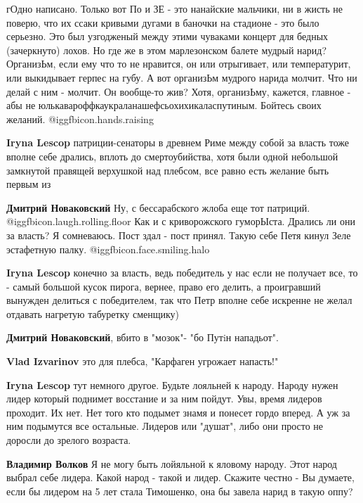 \begin{itemize}
гОдно написано. Только вот По и ЗЕ - это нанайские мальчики, ни в жисть не
поверю, что их ссаки кривыми дугами в баночки на стадионе - это было серьезно.
Это был узгодженый между этими чуваками концерт для бедных (зачеркнуто) лохов.
Но где же в этом марлезонском балете мудрый нарид? ОрганизЬм, если ему что то
не нравится, он или отрыгивает, или температурит, или выкидывает герпес на
губу. А вот организЬм мудрого нарида молчит. Что ни делай с ним - молчит. Он
вообще-то жив? Хотя, организЬму, кажется, главное - абы не
юлькавароффкаукраланашефсьохихикаласпутиным. Бойтесь своих желаний.  @igg{fbicon.hands.raising} 

\begin{itemize} %
\textbf{Iryna Lescop} патриции-сенаторы в древнем Риме между собой за власть тоже вполне себе дрались, вплоть до смертоубийства, хотя были одной небольшой замкнутой правящей верхушкой над плебсом, все равно есть желание быть первым из

\textbf{Дмитрий Новаковский} Ну, с бессарабского жлоба еще тот патриций.  @igg{fbicon.laugh.rolling.floor} Как и с криворожского гуморЫста. Дрались ли они за власть? Я сомневаюсь. Пост здал - пост принял. Такую себе Петя кинул Зеле эстафетную палку.  @igg{fbicon.face.smiling.halo} 

\textbf{Iryna Lescop} конечно за власть, ведь победитель у нас если не получает все, то - самый большой кусок пирога, вернее, право его делить, а проигравший вынужден делиться с победителем, так что Петр вполне себе искренне не желал отдавать нагретую табуретку сменщику)

\textbf{Дмитрий Новаковский}, вбито в "мозок"-
"бо Путiн нападьот".

\textbf{Vlad Izvarinov} это для плебса, "Карфаген угрожает напасть!"

\textbf{Iryna Lescop} тут немного другое. Будьте лояльней к народу.
Народу нужен лидер который поднимет восстание и за ним пойдут. Увы, время лидеров проходит. Их нет. Нет того кто подымет знамя и понесет гордо вперед. А уж за ним подымутся все остальные. Лидеров или "душат", либо они просто не доросли до зрелого возраста.

\textbf{Владимир Волков} Я не могу быть лойяльной к яловому народу. Этот народ выбрал себе лидера. Какой народ - такой и лидер. Скажите честно - Вы думаете, если бы лидером на 5 лет стала Тимошенко, она бы завела нарид в такую оппу?


\end{itemize}
\end{itemize}
